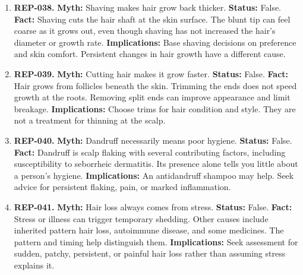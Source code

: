 \documentclass[11pt,oneside]{book}
\begin{document}
\begin{enumerate}[leftmargin=0pt,labelwidth=0pt,labelsep=0pt,itemindent=0pt]
\textbf{Implications:} A smoother or cooler sensation is an unreliable guide to smoke exposure. People nearby can also inhale secondhand smoke.
\item[] \textbf{REP-038.} \textbf{Myth:} Shaving makes hair grow back thicker.\newline
\textbf{Status:} False.\newline
\textbf{Fact:} Shaving cuts the hair shaft at the skin surface. The blunt tip can feel coarse as it grows out, even though shaving has not increased the hair's diameter or growth rate. \cite{ref338}\newline
\textbf{Implications:} Base shaving decisions on preference and skin comfort. Persistent changes in hair growth have a different cause.
\item[] \textbf{REP-039.} \textbf{Myth:} Cutting hair makes it grow faster.\newline
\textbf{Status:} False.\newline
\textbf{Fact:} Hair grows from follicles beneath the skin. Trimming the ends does not speed growth at the roots. Removing split ends can improve appearance and limit breakage. \cite{ref338}\newline
\textbf{Implications:} Choose trims for hair condition and style. They are not a treatment for thinning at the scalp.
\item[] \textbf{REP-040.} \textbf{Myth:} Dandruff necessarily means poor hygiene.\newline
\textbf{Status:} False.\newline
\textbf{Fact:} Dandruff is scalp flaking with several contributing factors, including susceptibility to seborrheic dermatitis. Its presence alone tells you little about a person's hygiene. \cite{ref263}\newline
\textbf{Implications:} An antidandruff shampoo may help. Seek advice for persistent flaking, pain, or marked inflammation.
\item[] \textbf{REP-041.} \textbf{Myth:} Hair loss always comes from stress.\newline
\textbf{Status:} False.\newline
\textbf{Fact:} Stress or illness can trigger temporary shedding. Other causes include inherited pattern hair loss, autoimmune disease, and some medicines. The pattern and timing help distinguish them. \cite{ref264}\newline
\textbf{Implications:} Seek assessment for sudden, patchy, persistent, or painful hair loss rather than assuming stress explains it.

\end{enumerate}
\end{document}
